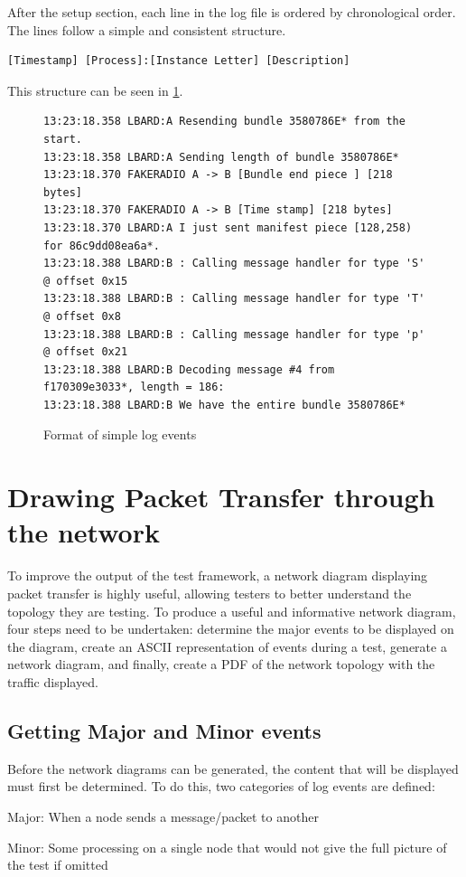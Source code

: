 After the setup section, each line in the log file is ordered by chronological order. 
The lines follow a simple and consistent structure.
\begin{center}
    \begin{lstlisting}[basicstyle=\small, breaklines]
[Timestamp] [Process]:[Instance Letter] [Description]
    \end{lstlisting}
\end{center}

This structure can be seen in \figurename{ \ref{fig:chapter5SimpleLogFormat}}.
\begin{figure}
    \begin{centering}
\begin{lstlisting}[basicstyle=\small, breaklines, frame=single]
13:23:18.358 LBARD:A Resending bundle 3580786E* from the start.
13:23:18.358 LBARD:A Sending length of bundle 3580786E* 
13:23:18.370 FAKERADIO A -> B [Bundle end piece ] [218 bytes]
13:23:18.370 FAKERADIO A -> B [Time stamp] [218 bytes]
13:23:18.370 LBARD:A I just sent manifest piece [128,258) for 86c9dd08ea6a*.
13:23:18.388 LBARD:B : Calling message handler for type 'S' @ offset 0x15
13:23:18.388 LBARD:B : Calling message handler for type 'T' @ offset 0x8
13:23:18.388 LBARD:B : Calling message handler for type 'p' @ offset 0x21
13:23:18.388 LBARD:B Decoding message #4 from f170309e3033*, length = 186:
13:23:18.388 LBARD:B We have the entire bundle 3580786E*    
\end{lstlisting}
        \caption{Format of simple log events}
        \label{fig:chapter5SimpleLogFormat}
    \end{centering}
\end{figure}


\section{Drawing Packet Transfer through the network}
To improve the output of the test framework, a network diagram displaying packet transfer is highly useful, allowing testers to better understand the topology they are testing. 
To produce a useful and informative network diagram, four steps need to be undertaken: determine the major events to be displayed on the diagram, create an ASCII representation of events during a test, generate a network diagram, and finally, create a PDF of the network topology with the traffic displayed.

\subsection{Getting Major and Minor events}
Before the network diagrams can be generated, the content that will be displayed must first be determined.
To do this, two categories of log events are defined: 
\begin{list}{}{}
    \item Major: When a node sends a message/packet to another
    \item Minor: Some processing on a single node that would not give the full picture of the test if omitted
\end{list}

